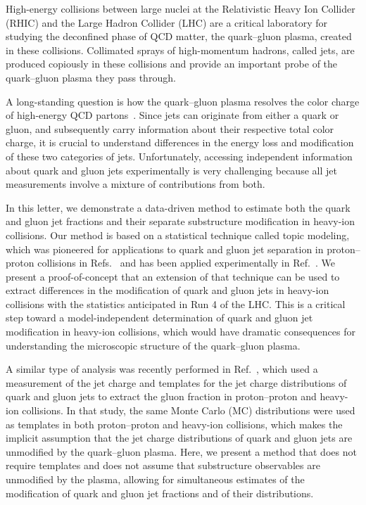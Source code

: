 \documentclass[aps,prl,twocolumn,preprintnumbers,showpacs,floatfix,nofootinbib]{revtex4-1}
\newcommand{\Refc}[1]{Ref.~\cite{#1}}
\newcommand{\Refsc}[1]{Refs.~\cite{#1}}
\begin{document}
High-energy collisions between large nuclei at the Relativistic Heavy Ion Collider (RHIC) and the Large Hadron Collider (LHC) are a critical laboratory for studying the deconfined phase of QCD matter, the quark--gluon plasma, created in these collisions.
%
Collimated sprays of high-momentum hadrons, called jets, are produced copiously in these collisions and provide an important probe of the quark--gluon plasma they pass through.


A long-standing question is how the quark--gluon plasma resolves the color charge of high-energy QCD partons~\cite{CaronHuot:2008ni,Spousta:2015fca,Chien:2018dfn, Mehtar-Tani:2018zba,Qiu:2019sfj,Apolinario:2020nyw}.
%
Since jets can originate from either a quark or gluon, and subsequently carry information about their respective total color charge, it is crucial to understand differences in the energy loss and modification of these two categories of jets.
%
Unfortunately, accessing independent information about quark and gluon jets experimentally is very challenging because all jet measurements involve a mixture of contributions from both.


In this letter, we demonstrate a data-driven method to estimate both the quark and gluon jet fractions and their separate substructure modification in heavy-ion collisions.
%
Our method is based on a statistical technique called topic modeling, which was pioneered for applications to quark and gluon jet separation in proton--proton collisions in \Refsc{Metodiev:2018ftz,Komiske:2018vkc} and has been applied experimentally in \Refc{Aad:2019onw}.
%
We present a proof-of-concept that an extension of that technique can be used to extract differences in the modification of quark and gluon jets in heavy-ion collisions with the statistics anticipated in Run 4 of the LHC.
%
This is a critical step toward a model-independent determination of quark and gluon jet modification in heavy-ion collisions, which would have dramatic consequences for understanding the microscopic structure of the quark--gluon plasma.


A similar type of analysis was recently performed in \Refc{Sirunyan:2020qvi}, which used a measurement of the jet charge and templates for the jet charge distributions of quark and gluon jets to extract the gluon fraction in proton--proton and heavy-ion collisions.
%
In that study, the same Monte Carlo (MC) distributions were used as templates in both proton--proton and heavy-ion collisions, which makes the implicit assumption that the jet charge distributions of quark and gluon jets are unmodified by the quark--gluon plasma.
%
Here, we present a method that does not require templates and does not assume that substructure observables are unmodified by the plasma, allowing for simultaneous estimates of the modification of quark and gluon jet fractions and of their distributions.
\end{document}
